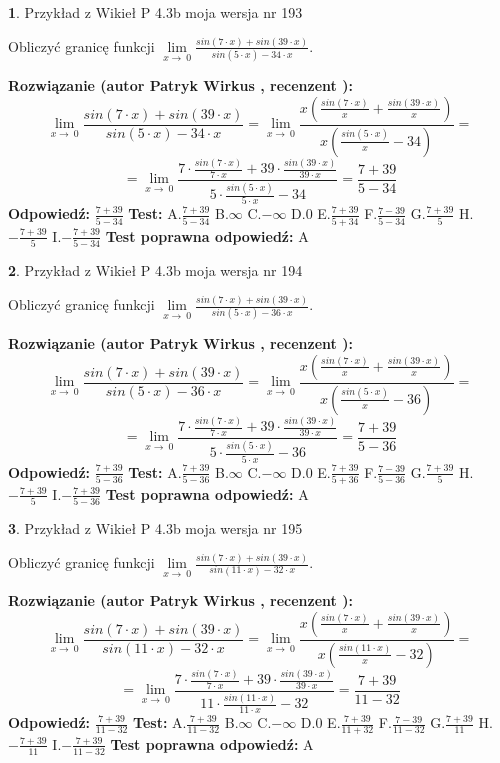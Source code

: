 \documentclass[12pt, a4paper]{article}
\theoremstyle{definition} %
\newtheorem{zad}{}
\newcommand{\zadStart}[1]{\begin{zad}#1\newline}
\newcommand{\zadStop}{\end{zad}}
\newcommand{\rozwStart}[2]{\noindent \textbf{Rozwiązanie (autor #1 , recenzent #2): }\newline}
\newcommand{\rozwStop}{\newline}
\newcommand{\odpStart}{\noindent \textbf{Odpowiedź:}\newline}
\newcommand{\odpStop}{\newline}
\newcommand{\testStart}{\noindent \textbf{Test:}\newline}
\newcommand{\testStop}{\newline}
\newcommand{\kluczStart}{\noindent \textbf{Test poprawna odpowiedź:}\newline}
\newcommand{\kluczStop}{\newline}
\begin{document}
\zadStart{Przykład z Wikieł P 4.3b moja wersja nr 193}


Obliczyć granicę funkcji $\lim\limits_{x\to\ 0}\frac{sin(7 \cdot x)+sin(39 \cdot x)}{sin(5 \cdot x)-34 \cdot x}$.
\zadStop
\rozwStart{Patryk Wirkus}{}
$$\lim\limits_{x\to\ 0}\frac{sin(7 \cdot x)+sin(39 \cdot x)}{sin(5 \cdot x)-34 \cdot x}=\lim\limits_{x\to\ 0}\frac{x(\frac{sin(7 \cdot x)}{x}+\frac{sin(39 \cdot x)}{x})}{x(\frac{sin(5 \cdot x)}{x}-34)}=$$
$$=\lim\limits_{x\to\ 0}\frac{7 \cdot \frac{sin(7 \cdot x)}{7 \cdot x}+39 \cdot \frac{sin(39 \cdot x)}{39 \cdot x}}{5 \cdot \frac{sin(5 \cdot x)}{5 \cdot x}-34}=\frac{7+39}{5-34}$$
\rozwStop
\odpStart
$\frac{7+39}{5-34}$
\odpStop
\testStart
A.$\frac{7+39}{5-34}$
B.$\infty$
C.$-\infty$
D.$0$
E.$\frac{7+39}{5+34}$
F.$\frac{7-39}{5-34}$
G.$\frac{7+39}{5}$
H.$-\frac{7+39}{5}$
I.$-\frac{7+39}{5-34}$
\testStop
\kluczStart
A
\kluczStop



\zadStart{Przykład z Wikieł P 4.3b moja wersja nr 194}


Obliczyć granicę funkcji $\lim\limits_{x\to\ 0}\frac{sin(7 \cdot x)+sin(39 \cdot x)}{sin(5 \cdot x)-36 \cdot x}$.
\zadStop
\rozwStart{Patryk Wirkus}{}
$$\lim\limits_{x\to\ 0}\frac{sin(7 \cdot x)+sin(39 \cdot x)}{sin(5 \cdot x)-36 \cdot x}=\lim\limits_{x\to\ 0}\frac{x(\frac{sin(7 \cdot x)}{x}+\frac{sin(39 \cdot x)}{x})}{x(\frac{sin(5 \cdot x)}{x}-36)}=$$
$$=\lim\limits_{x\to\ 0}\frac{7 \cdot \frac{sin(7 \cdot x)}{7 \cdot x}+39 \cdot \frac{sin(39 \cdot x)}{39 \cdot x}}{5 \cdot \frac{sin(5 \cdot x)}{5 \cdot x}-36}=\frac{7+39}{5-36}$$
\rozwStop
\odpStart
$\frac{7+39}{5-36}$
\odpStop
\testStart
A.$\frac{7+39}{5-36}$
B.$\infty$
C.$-\infty$
D.$0$
E.$\frac{7+39}{5+36}$
F.$\frac{7-39}{5-36}$
G.$\frac{7+39}{5}$
H.$-\frac{7+39}{5}$
I.$-\frac{7+39}{5-36}$
\testStop
\kluczStart
A
\kluczStop



\zadStart{Przykład z Wikieł P 4.3b moja wersja nr 195}


Obliczyć granicę funkcji $\lim\limits_{x\to\ 0}\frac{sin(7 \cdot x)+sin(39 \cdot x)}{sin(11 \cdot x)-32 \cdot x}$.
\zadStop
\rozwStart{Patryk Wirkus}{}
$$\lim\limits_{x\to\ 0}\frac{sin(7 \cdot x)+sin(39 \cdot x)}{sin(11 \cdot x)-32 \cdot x}=\lim\limits_{x\to\ 0}\frac{x(\frac{sin(7 \cdot x)}{x}+\frac{sin(39 \cdot x)}{x})}{x(\frac{sin(11 \cdot x)}{x}-32)}=$$
$$=\lim\limits_{x\to\ 0}\frac{7 \cdot \frac{sin(7 \cdot x)}{7 \cdot x}+39 \cdot \frac{sin(39 \cdot x)}{39 \cdot x}}{11 \cdot \frac{sin(11 \cdot x)}{11 \cdot x}-32}=\frac{7+39}{11-32}$$
\rozwStop
\odpStart
$\frac{7+39}{11-32}$
\odpStop
\testStart
A.$\frac{7+39}{11-32}$
B.$\infty$
C.$-\infty$
D.$0$
E.$\frac{7+39}{11+32}$
F.$\frac{7-39}{11-32}$
G.$\frac{7+39}{11}$
H.$-\frac{7+39}{11}$
I.$-\frac{7+39}{11-32}$
\testStop
\kluczStart
A
\kluczStop
\end{document}
